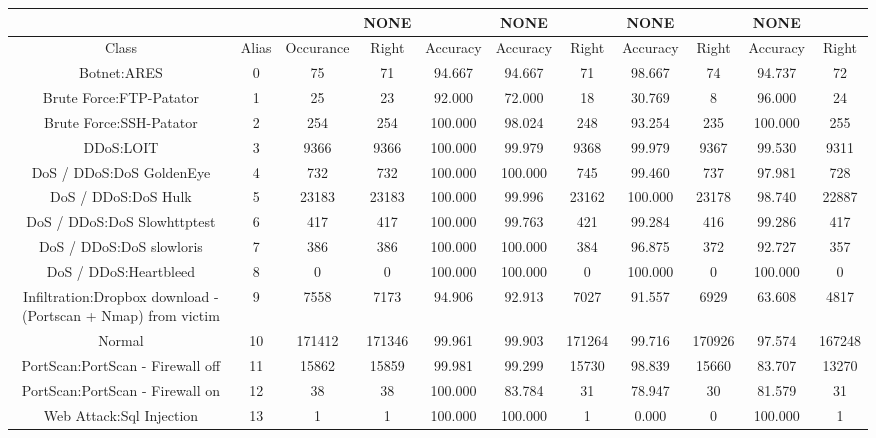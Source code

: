 \begin{table}[htb]
    \centering
    \begin{tabular}{@{}ccccccccccc@{}}
        \toprule
         &  &  & NONE &  & NONE &  & NONE &  & NONE &  \\
        \midrule
        Class &  Alias &  Occurance &  Right &  Accuracy &  Accuracy &  Right &  Accuracy &  Right &  Accuracy &  Right \\
        Botnet:ARES &  0 &  75 &  71 &  94.667 &  94.667 &  71 &  98.667 &  74 &  94.737 &  72 \\
        Brute Force:FTP-Patator &  1 &  25 &  23 &  92.000 &  72.000 &  18 &  30.769 &  8 &  96.000 &  24 \\
        Brute Force:SSH-Patator &  2 &  254 &  254 &  100.000 &  98.024 &  248 &  93.254 &  235 &  100.000 &  255 \\
        DDoS:LOIT &  3 &  9366 &  9366 &  100.000 &  99.979 &  9368 &  99.979 &  9367 &  99.530 &  9311 \\
        DoS / DDoS:DoS GoldenEye &  4 &  732 &  732 &  100.000 &  100.000 &  745 &  99.460 &  737 &  97.981 &  728 \\
        DoS / DDoS:DoS Hulk &  5 &  23183 &  23183 &  100.000 &  99.996 &  23162 &  100.000 &  23178 &  98.740 &  22887 \\
        DoS / DDoS:DoS Slowhttptest &  6 &  417 &  417 &  100.000 &  99.763 &  421 &  99.284 &  416 &  99.286 &  417 \\
        DoS / DDoS:DoS slowloris &  7 &  386 &  386 &  100.000 &  100.000 &  384 &  96.875 &  372 &  92.727 &  357 \\
        DoS / DDoS:Heartbleed &  8 &  0 &  0 &  100.000 &  100.000 &  0 &  100.000 &  0 &  100.000 &  0 \\
        Infiltration:Dropbox download - (Portscan + Nmap) from victim &  9 &  7558 &  7173 &  94.906 &  92.913 &  7027 &  91.557 &  6929 &  63.608 &  4817 \\
        Normal &  10 &  171412 &  171346 &  99.961 &  99.903 &  171264 &  99.716 &  170926 &  97.574 &  167248 \\
        PortScan:PortScan - Firewall off &  11 &  15862 &  15859 &  99.981 &  99.299 &  15730 &  98.839 &  15660 &  83.707 &  13270 \\
        PortScan:PortScan - Firewall on &  12 &  38 &  38 &  100.000 &  83.784 &  31 &  78.947 &  30 &  81.579 &  31 \\
        Web Attack:Sql Injection &  13 &  1 &  1 &  100.000 &  100.000 &  1 &  0.000 &  0 &  100.000 &  1 \\

\end{tabular}
\end{table}
